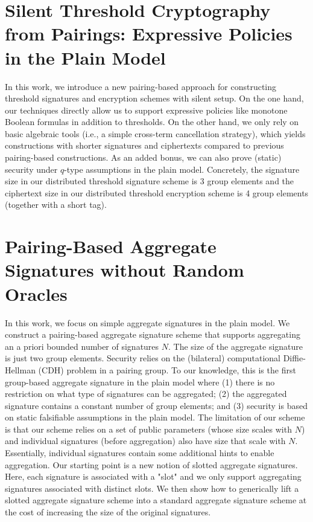 \documentclass[11pt,oneside]{book}
\theoremstyle{definition}
\theoremstyle{remark}
\theoremstyle{plain}
\begin{document}
\section{\cite{cryptoeprint:2025/1547} Silent Threshold Cryptography from Pairings: Expressive Policies in the Plain Model}
 In this work, we introduce a new pairing-based approach for constructing threshold signatures and encryption schemes with silent setup. On the one hand, our techniques directly allow us to support expressive policies like monotone Boolean formulas in addition to thresholds. On the other hand, we only rely on basic algebraic tools (i.e., a simple cross-term cancellation strategy), which yields constructions with shorter signatures and ciphertexts compared to previous pairing-based constructions. As an added bonus, we can also prove (static) security under $q$-type assumptions in the plain model. Concretely, the signature size in our distributed threshold signature scheme is 3 group elements and the ciphertext size in our distributed threshold encryption scheme is 4 group elements (together with a short tag).
 \section{\cite{cryptoeprint:2025/1548} Pairing-Based Aggregate Signatures without Random Oracles}
 In this work, we focus on simple aggregate signatures in the plain model. We construct a pairing-based aggregate signature scheme that supports aggregating an a priori bounded number of signatures $N$. The size of the aggregate signature is just two group elements. Security relies on the (bilateral) computational Diffie-Hellman (CDH) problem in a pairing group. To our knowledge, this is the first group-based aggregate signature in the plain model where (1) there is no restriction on what type of signatures can be aggregated; (2) the aggregated signature contains a constant number of group elements; and (3) security is based on static falsifiable assumptions in the plain model. The limitation of our scheme is that our scheme relies on a set of public parameters (whose size scales with $N$) and individual signatures (before aggregation) also have size that scale with $N$. Essentially, individual signatures contain some additional hints to enable aggregation. Our starting point is a new notion of slotted aggregate signatures. Here, each signature is associated with a "slot" and we only support aggregating signatures associated with distinct slots. We then show how to generically lift a slotted aggregate signature scheme into a standard aggregate signature scheme at the cost of increasing the size of the original signatures.
\end{document}
